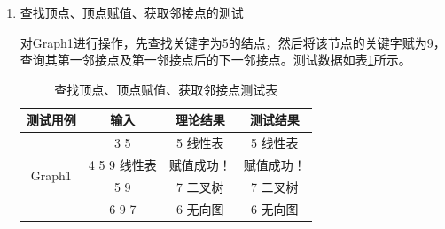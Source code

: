 \documentclass[supercite]{Experimental_Report}
\theoremstyle{definition}
\begin{document}
\begin{enumerate}
	\item 查找顶点、顶点赋值、获取邻接点的测试
	
	对Graph1进行操作，先查找关键字为5的结点，然后将该节点的关键字赋为9，查询其第一邻接点及第一邻接点后的下一邻接点。测试数据如表\ref{table4}所示。
	\begin{table}
		\begin{center}
		\setlength{\tabcolsep}{2.0mm}
		\caption{查找顶点、顶点赋值、获取邻接点测试表}
		\label{table4}
			\begin{tabular}{c|c|c|c}
			\hline
			测试用例    			     & 输入               & 理论结果         & 测试结果\\
			\hline
			\hline			
			\multirow{4}{*}{Graph1}   	& 3 5              	 & 5 线性表        & 5 线性表\\
										& 4 5 9 线性表        & 赋值成功！      & 赋值成功！\\
										& 5	9		         & 7 二叉树 	   & 7 二叉树\\
										& 6	9 7			     & 6 无向图 	   & 6 无向图\\
			\hline
			\end{tabular}
		\end{center}
	\end{table}


\end{enumerate}
\end{document}
